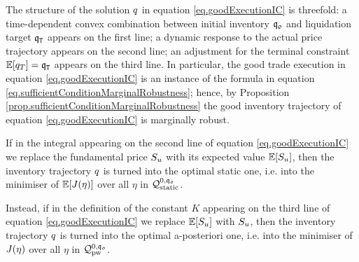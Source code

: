 \documentclass[10pt,a4paper]{article}
\begin{document}
\begin{remark}\label{remark.turnGoodExecutionIntoStaticAndIntoAposteriori}
The structure of the solution $q$ in equation \eqref{eq.goodExecutionIC} is threefold: a time-dependent convex combination between initial inventory $\mathfrak{q_0}$ and liquidation target $\mathfrak{q}_{\mathtt{T} }$ appears on the first line; a dynamic response to the actual price trajectory appears on the second line; an adjustment for the terminal constraint $\mathbb{{E}}[q_T]  = \mathfrak{q}_{\mathtt{T} }$ appears on the third line. In particular, the good trade execution in equation \eqref{eq.goodExecutionIC} is an instance of the formula in equation \eqref{eq.sufficientConditionMarginalRobustness}; hence, by Proposition \ref{prop.sufficientConditionMarginalRobustness} the good inventory trajectory of equation \eqref{eq.goodExecutionIC} is marginally robust. 

If in the integral appearing on the second line of equation  \eqref{eq.goodExecutionIC} we replace the fundamental price $S_u$ with its expected value $\mathbb{{E}}[S_u]$, then  the inventory trajectory $q$ is turned into the optimal static one, i.e. into the minimiser of $\mathbb{{E}} [J(\eta)]$ over all $\eta$ in $\mathcal{Q}_{\text{static}}^{0,\mathfrak{q_0}}$.

Instead, if in the definition of the constant  $K$ appearing on  the third line of equation  \eqref{eq.goodExecutionIC} we replace $\mathbb{{E}}[S_u]$ with $S_u$, then the inventory trajectory $q$ is turned into the optimal a-posteriori one, i.e. into the minimiser of $J(\eta)$ over all $\eta$ in $\mathcal{Q}_{\text{pw}}^{0,\mathfrak{q_0}}$. 
\end{remark}
\end{document}
